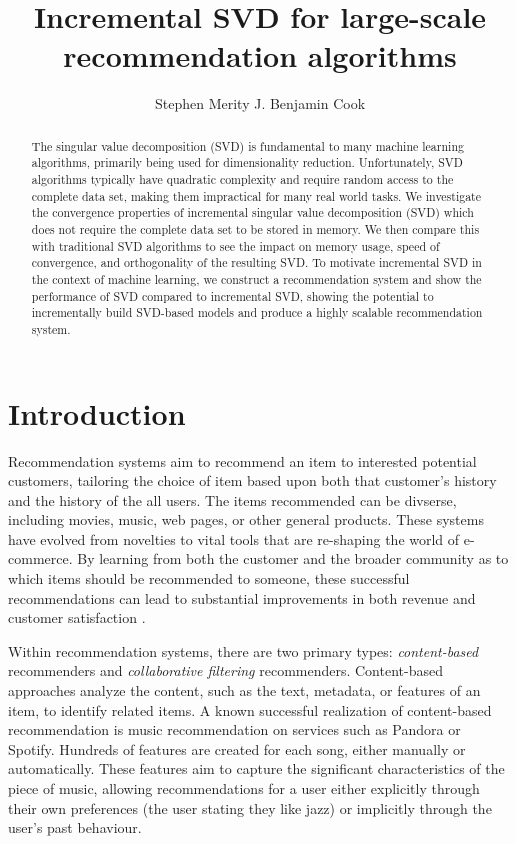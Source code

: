 \documentclass{article} %
\title{Incremental SVD for large-scale recommendation algorithms}
\author{
Stephen Merity
\And
J. Benjamin Cook
}
\begin{document}
\maketitle

\begin{abstract}
The singular value decomposition (SVD) is fundamental to many machine learning algorithms, primarily being used for dimensionality reduction.
Unfortunately, SVD algorithms typically have quadratic complexity and require random access to the complete data set, making them impractical for many real world tasks.
We investigate the convergence properties of incremental singular value decomposition (SVD) which does not require the complete data set to be stored in memory.
We then compare this with traditional SVD algorithms to see the impact on memory usage, speed of convergence, and orthogonality of the resulting SVD.
To motivate incremental SVD in the context of machine learning, we construct a recommendation system and show the performance of SVD compared to incremental SVD, showing the potential to incrementally build SVD-based models and produce a highly scalable recommendation system.
\end{abstract}

\section{Introduction}

Recommendation systems aim to recommend an item to interested potential customers, tailoring the choice of item based upon both that customer's history and the history of the all users.
The items recommended can be divserse, including movies, music, web pages, or other general products.
These systems have evolved from novelties to vital tools that are re-shaping the world of e-commerce.
By learning from both the customer and the broader community as to which items should be recommended to someone, these successful recommendations can lead to substantial improvements in both revenue and customer satisfaction \citep{schafer1999recommender}.

Within recommendation systems, there are two primary types: \textit{content-based} recommenders and \textit{collaborative filtering} recommenders.
Content-based approaches analyze the content, such as the text, metadata, or features of an item, to identify related items.
A known successful realization of content-based recommendation is music recommendation on services such as Pandora or Spotify.
Hundreds of features are created for each song, either manually or automatically.
These features aim to capture the significant characteristics of the piece of music, allowing recommendations for a user either explicitly through their own preferences (the user stating they like jazz) or implicitly through the user's past behaviour.
\end{document}
